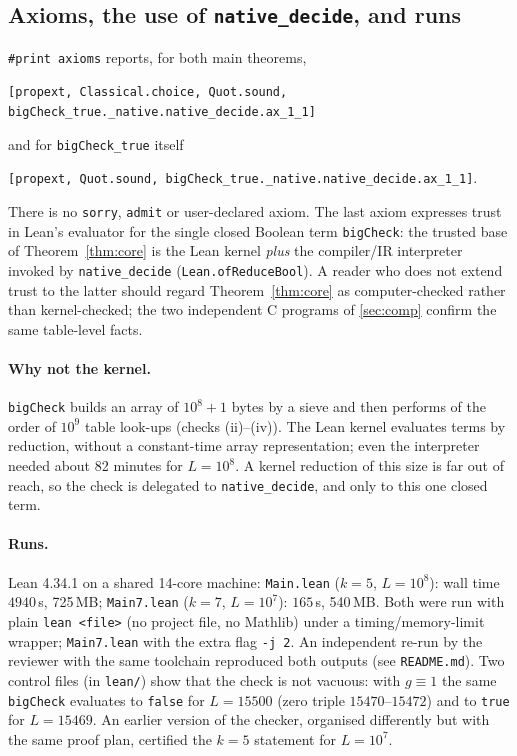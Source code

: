 \documentclass[11pt]{article}
\numberwithin{equation}{section}
\theoremstyle{definition}
\theoremstyle{remark}
\begin{document}
\subsection{Axioms, the use of \texttt{native\_decide}, and runs}
\texttt{\#print axioms} reports, for both main theorems,
\begin{center}\small
\texttt{[propext, Classical.choice, Quot.sound, bigCheck\_true.\_native.native\_decide.ax\_1\_1]}
\end{center}
and for \texttt{bigCheck\_true} itself
\begin{center}\small
\texttt{[propext, Quot.sound, bigCheck\_true.\_native.native\_decide.ax\_1\_1]}.
\end{center}
There is no \texttt{sorry}, \texttt{admit} or user-declared axiom. The last axiom expresses trust in Lean's
evaluator for the single closed Boolean term \texttt{bigCheck}: the trusted base of Theorem~\ref{thm:core}
is the Lean kernel \emph{plus} the compiler/IR interpreter invoked by \texttt{native\_decide}
(\texttt{Lean.ofReduceBool}). A reader who does not extend trust to the latter should regard
Theorem~\ref{thm:core} as computer-checked rather than kernel-checked; the two independent C programs
of \cref{sec:comp} confirm the same table-level facts.

\paragraph{Why not the kernel.} \texttt{bigCheck} builds an array of $10^8+1$ bytes by a sieve and then
performs of the order of $10^9$ table look-ups (checks (ii)--(iv)). The Lean kernel evaluates terms by
reduction, without a constant-time array representation; even the interpreter needed about 82 minutes
for $L=10^8$. A kernel reduction of this size is far out of reach, so the check is delegated to
\texttt{native\_decide}, and only to this one closed term.

\paragraph{Runs.} Lean 4.34.1 on a shared 14-core machine:
\texttt{Main.lean} ($k=5$, $L=10^8$): wall time $4940$\,s, 725\,MB;
\texttt{Main7.lean} ($k=7$, $L=10^7$): $165$\,s, 540\,MB. Both were run with plain
\texttt{lean <file>} (no project file, no Mathlib) under a timing/memory-limit wrapper;
\texttt{Main7.lean} with the extra flag \texttt{-j 2}. An independent re-run by the reviewer with the
same toolchain reproduced both outputs (see \texttt{README.md}).
Two control files (in \texttt{lean/}) show that the check is not vacuous: with $g\equiv1$ the same
\texttt{bigCheck} evaluates to \texttt{false} for $L=15500$ (zero triple $15470$--$15472$) and to
\texttt{true} for $L=15469$. An earlier version of the checker, organised differently but with the same
proof plan, certified the $k=5$ statement for $L=10^7$.
\end{document}

